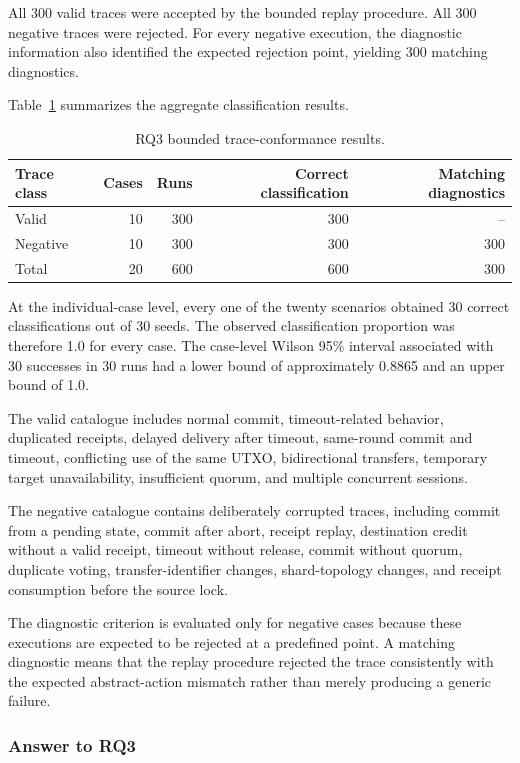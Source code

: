 All 300 valid traces were accepted by the bounded replay procedure.
All 300 negative traces were rejected. For every negative execution,
the diagnostic information also identified the expected rejection
point, yielding 300 matching diagnostics.

Table~\ref{tab:rq3-summary} summarizes the aggregate classification
results.

\begin{table}[htbp]
\centering
\caption{RQ3 bounded trace-conformance results.}
\label{tab:rq3-summary}
\begin{tabular}{lrrrr}
\hline
Trace class &
Cases &
Runs &
Correct classification &
Matching diagnostics \\
\hline
Valid    & 10 & 300 & 300 & --  \\
Negative & 10 & 300 & 300 & 300 \\
\hline
Total    & 20 & 600 & 600 & 300 \\
\hline
\end{tabular}
\end{table}

At the individual-case level, every one of the twenty scenarios
obtained 30 correct classifications out of 30 seeds. The observed
classification proportion was therefore 1.0 for every case. The
case-level Wilson 95\% interval associated with 30 successes in 30
runs had a lower bound of approximately 0.8865 and an upper bound of
1.0.

The valid catalogue includes normal commit, timeout-related behavior,
duplicated receipts, delayed delivery after timeout, same-round commit
and timeout, conflicting use of the same UTXO, bidirectional
transfers, temporary target unavailability, insufficient quorum, and
multiple concurrent sessions.

The negative catalogue contains deliberately corrupted traces,
including commit from a pending state, commit after abort, receipt
replay, destination credit without a valid receipt, timeout without
release, commit without quorum, duplicate voting, transfer-identifier
changes, shard-topology changes, and receipt consumption before the
source lock.

The diagnostic criterion is evaluated only for negative cases because
these executions are expected to be rejected at a predefined point.
A matching diagnostic means that the replay procedure rejected the
trace consistently with the expected abstract-action mismatch rather
than merely producing a generic failure.

\subsubsection{Answer to RQ3}
\label{subsubsec:rq3-answer}

